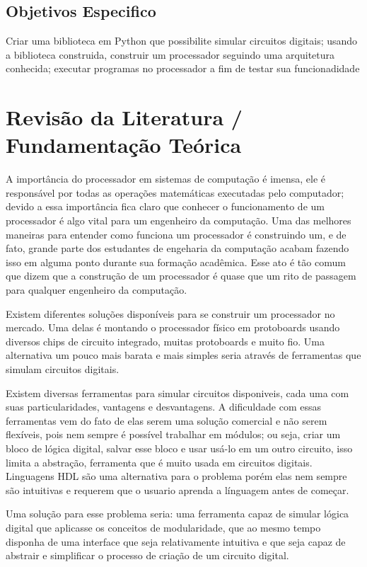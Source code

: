\documentclass[12pt]{report}
\begin{document}
\section{Objetivos Especifico}
Criar uma biblioteca em Python que possibilite simular circuitos digitais; usando a biblioteca construida, construir um processador seguindo uma arquitetura conhecida; executar programas no processador a fim de testar sua funcionadidade
\chapter{Revisão da Literatura / Fundamentação Teórica}

A importância do processador em sistemas de computação é imensa, ele é responsável por todas as operações matemáticas executadas pelo computador; devido a essa importância fica claro que conhecer o funcionamento de um processador é algo vital para um engenheiro da computação. Uma das melhores maneiras para entender como funciona um processador é construindo um, e de fato, grande parte dos estudantes de engeharia da computação acabam fazendo isso em alguma ponto durante sua formação acadêmica. Esse ato é tão comum que \cite{harris} dizem que a construção de um processador é quase que um rito de passagem para qualquer engenheiro da computação.

Existem diferentes soluções disponíveis para se construir um processador no mercado. Uma delas é montando o processador físico em protoboards usando diversos chips de circuito integrado, muitas protoboards e muito fio. Uma alternativa um pouco mais barata e mais simples seria através de ferramentas que simulam circuitos digitais. 

Existem diversas ferramentas para simular circuitos disponiveis, cada uma com suas particularidades, vantagens e desvantagens. A dificuldade com essas ferramentas vem do fato de elas serem uma solução comercial e não serem flexíveis, pois nem sempre é possível trabalhar em módulos; ou seja, criar um bloco de lógica digital, salvar esse bloco e usar usá-lo em um outro circuito, isso limita a abstração, ferramenta que é muito usada em circuitos digitais. Linguagens HDL são uma alternativa para o problema porém elas nem sempre são intuitivas e requerem que o usuario aprenda a línguagem antes de começar.

Uma solução para esse problema seria: uma ferramenta capaz de simular lógica digital que aplicasse os conceitos de modularidade, que ao mesmo tempo disponha de uma interface que seja relativamente intuitiva e que seja capaz de abstrair e simplificar o processo de criação de um circuito digital.
\end{document}
